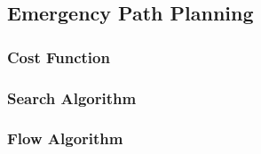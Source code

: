 \subsection{Emergency Path Planning}
\subsubsection{Cost Function}
\subsubsection{Search Algorithm}
\subsubsection{Flow Algorithm}
